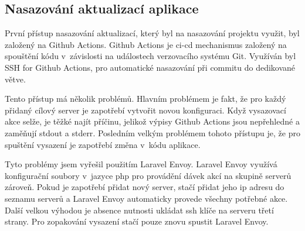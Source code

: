 \subsection{Nasazování aktualizací aplikace}
\label{sub:update-deployment}

První přístup nasazování aktualizací, který byl na nasazování projektu \linebreak
\bso využit, byl založený na Github Actions\cite{github-actions}. Github Actions je \gls{ci-cd} mechanismus založený na spouštění kódu v~závislosti na událostech verzovacího systému Git\cite{git}. Využíván byl SSH for Github Actions\cite{ssh-for-github-actions}, pro automatické nasazování při commitu do dedikované větve.

Tento přístup má několik problémů. Hlavním problémem je fakt, že pro každý přidaný cílový server je zapotřebí vytvořit novou konfiguraci. Když vysazovací akce selže, je těžké najít příčinu, jelikož výpisy Github Actions jsou nepřehledné a zaměňují \acrshort{stdout} a \acrshort{stderr}. Posledním velkým problémem tohoto přístupu je, že pro spuštění vysazení je zapotřebí změna v~kódu aplikace.

Tyto problémy jsem vyřešil použitím Laravel Envoy\cite{laravel-envoy}. Laravel Envoy využívá konfigurační soubory v~jazyce \acrshort{php} pro provádění dávek akcí na skupině serverů zároveň. Pokud je zapotřebí přidat nový server, stačí přidat jeho \acrshort{ip} adresu do seznamu serverů a Laravel Envoy automaticky provede všechny potřebné akce. Další velkou výhodou je absence nutnosti ukládat \acrshort{ssh} klíče na serveru třetí strany. Pro zopakování vysazení stačí pouze znovu spustit Laravel Envoy.